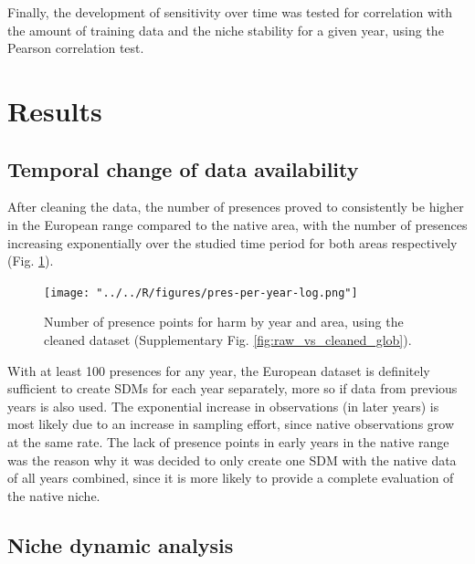 \documentclass[12pt,a4paper]{article}
\begin{document}
Finally, the development of sensitivity over time was tested for correlation with the amount of training data and the niche stability for a given year, using the Pearson correlation test.

\newpage
\section{Results} \label{sec:results}

\subsection{Temporal change of data availability} \label{ssec:temp_data_change}
After cleaning the data, the number of presences proved to consistently be higher in the European range compared to the native area, with the number of presences increasing exponentially over the studied time period for both areas respectively (Fig. \ref{fig:pres_per_year_log}).

\begin{figure}[!h]
    \centering
    \texttt{[image: "../../R/figures/pres-per-year-log.png"]}
    \caption{\label{fig:pres_per_year_log} Number of presence points for \gls{harm} by year and area, using the cleaned dataset (Supplementary Fig. \ref{fig:raw_vs_cleaned_glob}).}
\end{figure}

With at least 100 presences for any year, the European dataset is definitely sufficient to create SDMs for each year separately, more so if data from previous years is also used.
The exponential increase in observations (in later years) is most likely due to an increase in sampling effort, since native observations grow at the same rate.
The lack of presence points in early years in the native range was the reason why it was decided to only create one SDM with the native data of all years combined, since it is more likely to provide a complete evaluation of the native niche.

\subsection{Niche dynamic analysis} \label{ssec:niche_dyn_analysis}
\end{document}
